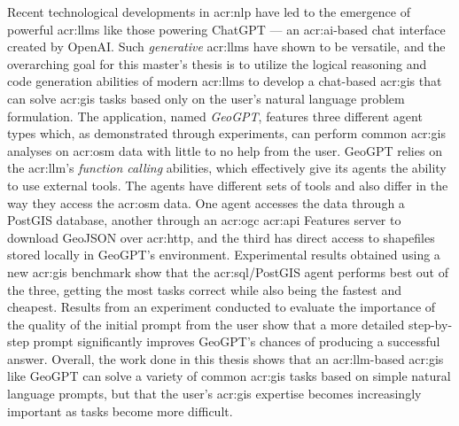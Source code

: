Recent technological developments in \acrlong{acr:nlp} have led to the emergence of powerful \glspl{acr:llm} like those powering ChatGPT --- an \acrshort{acr:ai}-based chat interface created by OpenAI. Such \textit{generative} \glspl{acr:llm} have shown to be versatile, and the overarching goal for this master's thesis is to utilize the logical reasoning and code generation abilities of modern \glspl{acr:llm} to develop a chat-based \acrshort{acr:gis} that can solve \acrshort{acr:gis} tasks based only on the user's natural language problem formulation. The application, named \textit{GeoGPT}, features three different agent types which, as demonstrated through experiments, can perform common \acrshort{acr:gis} analyses on \gls{acr:osm} data with little to no help from the user. GeoGPT relies on the \acrshort{acr:llm}'s \textit{function calling} abilities, which effectively give its agents the ability to use external tools. The agents have different sets of tools and also differ in the way they access the \gls{acr:osm} data. One agent accesses the data through a PostGIS database, another through an \acrshort{acr:ogc} \acrshort{acr:api} Features server to download GeoJSON over \acrshort{acr:http}, and the third has direct access to shapefiles stored locally in GeoGPT's environment. Experimental results obtained using a new \acrshort{acr:gis} benchmark show that the \acrshort{acr:sql}/PostGIS agent performs best out of the three, getting the most tasks correct while also being the fastest and cheapest. Results from an experiment conducted to evaluate the importance of the quality of the initial prompt from the user show that a more detailed step-by-step prompt significantly improves GeoGPT's chances of producing a successful answer. Overall, the work done in this thesis shows that an \acrshort{acr:llm}-based \acrshort{acr:gis} like GeoGPT can solve a variety of common \acrshort{acr:gis} tasks based on simple natural language prompts, but that the user's \acrshort{acr:gis} expertise becomes increasingly important as tasks become more difficult.


\glsresetall
